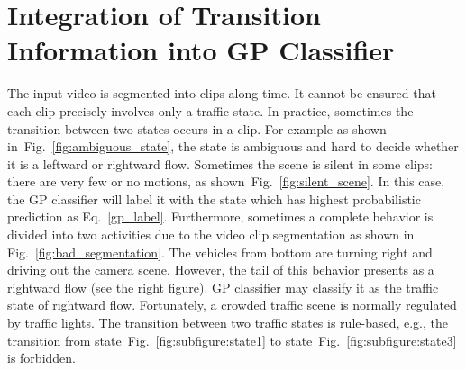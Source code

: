 \section{Integration of Transition Information into GP Classifier}
\label{framework:gp+hmm}
The input video is segmented into clips along time. 
It cannot be ensured that each clip precisely involves only a traffic state. 
In practice, sometimes the transition between two states occurs in a clip. 
For example as shown in~Fig.~\ref{fig:ambiguous_state}, the state is ambiguous and hard to decide whether it is a leftward or rightward flow.
Sometimes the scene is silent in some clips: there are very few or no motions, as shown~Fig.~\ref{fig:silent_scene}. 
In this case, the GP classifier will label it with the state which has highest probabilistic prediction as Eq.~\eqref{gp_label}. 
Furthermore, sometimes a complete behavior is divided into two activities due to the video clip segmentation as shown in Fig.~\ref{fig:bad_segmentation}. The vehicles from bottom are turning right and driving out the camera scene. However, the tail of this behavior presents as a rightward flow (see the right figure). GP classifier may classify it as the traffic state of rightward flow.
Fortunately, a crowded traffic scene is normally regulated by traffic lights. 
The transition between two traffic states is rule-based, e.g., the transition from state~Fig.~\ref{fig:subfigure:state1} to state~Fig.~\ref{fig:subfigure:state3} is forbidden.

